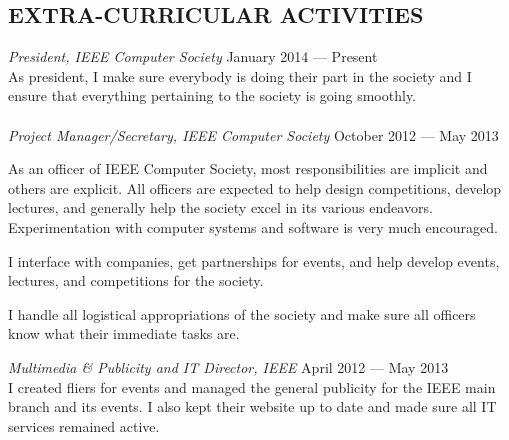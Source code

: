 \documentclass[margin]{res}
\begin{document}
\begin{resume}
  \section{EXTRA-CURRICULAR ACTIVITIES}             
  {\sl President, IEEE Computer Society}
  \hfill January 2014 --- Present \\
  As president, I make sure everybody is doing their part in the
  society and I ensure that everything pertaining to the society is
  going smoothly.\\\\
  {\sl Project Manager/Secretary, IEEE Computer Society}
  \hfill October 2012 --- May 2013 \\
  \vspace{-0.75em}
  \begin{adjustwidth}{1.5em}{0pt}
    As an officer of IEEE Computer Society, most responsibilities are
    implicit and others are explicit. All officers are expected to
    help design competitions, develop lectures, and generally help the
    society excel in its various endeavors. Experimentation with
    computer systems and software is very much encouraged.
      \begin{description}[leftmargin=1.5em] 
      \item [Project Manager] I interface with companies, get
        partnerships for events, and help develop events, lectures,
        and competitions for the society.
      \item [Secretary] I handle all logistical appropriations of the
        society and make sure all officers know what their immediate
        tasks are.
    \end{description}     
  \end{adjustwidth}
  {\sl Multimedia \& Publicity and IT Director, IEEE}
  \hfill April 2012 --- May 2013 \\
  I created fliers for events and managed the general publicity for
  the IEEE main branch and its events. I also kept their website up to
  date and made sure all IT services remained active.
\end{resume}
\end{document}
